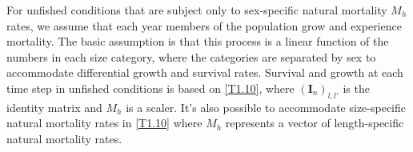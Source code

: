 \documentclass[12pt,letterpaper]{article}
\begin{document}
    For unfished conditions that are subject only to sex-specific natural mortality $M_h$ rates, we assume that each year members of the population grow and experience mortality.  The basic assumption is that this process is a linear function of the numbers in each size category, where the categories are separated by  sex to accommodate differential growth and survival rates.  Survival and growth at each time step in unfished conditions is based on \eqref{T1.10}, where $(\pmb{I}_n)_{l,l'}$ is the identity matrix and $M_h$ is a scaler. It's also possible to accommodate size-specific natural mortality rates in \eqref{T1.10} where $M_h$ represents a vector of length-specific natural mortality rates.



\end{document}

